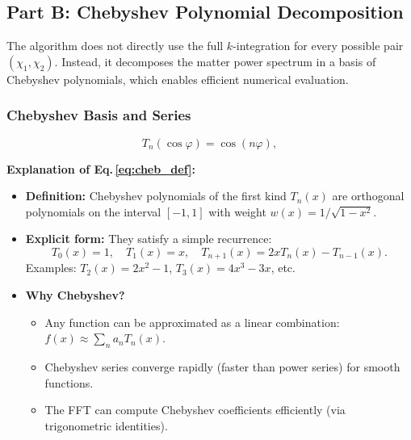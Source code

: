 \subsection{Part B: Chebyshev Polynomial Decomposition}

The algorithm does not directly use the full $k$-integration for every possible pair $(\chi_1, \chi_2)$. Instead, it decomposes the matter power spectrum in a basis of Chebyshev polynomials, which enables efficient numerical evaluation.

\subsubsection{Chebyshev Basis and Series}

\begin{equation}
    T_n(\cos\varphi) = \cos(n\varphi),
    \label{eq:cheb_def}
\end{equation}

\noindent\textbf{\large Explanation of Eq.\,\eqref{eq:cheb_def}:}\\

\begin{itemize}[leftmargin=1.5cm]
    \item \textbf{Definition:} Chebyshev polynomials of the first kind $T_n(x)$ are orthogonal polynomials on the interval $[-1,1]$ with weight $w(x) = 1/\sqrt{1-x^2}$.
    
    \item \textbf{Explicit form:} They satisfy a simple recurrence:
    \begin{equation}
        T_0(x) = 1, \quad T_1(x) = x, \quad T_{n+1}(x) = 2x T_n(x) - T_{n-1}(x).
    \end{equation}
    Examples: $T_2(x) = 2x^2 - 1$, $T_3(x) = 4x^3 - 3x$, etc.

    \item \textbf{Why Chebyshev?}
    \begin{itemize}
        \item Any function can be approximated as a linear combination: $f(x) \approx \sum_n a_n T_n(x)$.
        \item Chebyshev series converge rapidly (faster than power series) for smooth functions.
        \item The FFT can compute Chebyshev coefficients efficiently (via trigonometric identities).
    \end{itemize}
\end{itemize}

